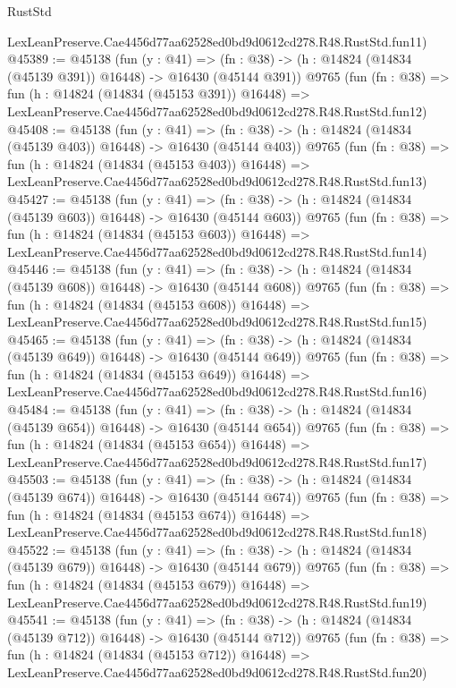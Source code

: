 \begin{lexlean}{RustStd}
\begin{coremodule}
    LexLeanPreserve.Cae4456d77aa62528ed0bd9d0612cd278.R48.RustStd.fun11)
@45389 := @45138
    (fun (y : @41) =>
    (fn : @38) -> (h : @14824 (@14834 (@45139 @391)) @16448) -> @16430 (@45144 @391))
    @9765
    (fun (fn : @38) =>
    fun (h : @14824 (@14834 (@45153 @391)) @16448) =>
    LexLeanPreserve.Cae4456d77aa62528ed0bd9d0612cd278.R48.RustStd.fun12)
@45408 := @45138
    (fun (y : @41) =>
    (fn : @38) -> (h : @14824 (@14834 (@45139 @403)) @16448) -> @16430 (@45144 @403))
    @9765
    (fun (fn : @38) =>
    fun (h : @14824 (@14834 (@45153 @403)) @16448) =>
    LexLeanPreserve.Cae4456d77aa62528ed0bd9d0612cd278.R48.RustStd.fun13)
@45427 := @45138
    (fun (y : @41) =>
    (fn : @38) -> (h : @14824 (@14834 (@45139 @603)) @16448) -> @16430 (@45144 @603))
    @9765
    (fun (fn : @38) =>
    fun (h : @14824 (@14834 (@45153 @603)) @16448) =>
    LexLeanPreserve.Cae4456d77aa62528ed0bd9d0612cd278.R48.RustStd.fun14)
@45446 := @45138
    (fun (y : @41) =>
    (fn : @38) -> (h : @14824 (@14834 (@45139 @608)) @16448) -> @16430 (@45144 @608))
    @9765
    (fun (fn : @38) =>
    fun (h : @14824 (@14834 (@45153 @608)) @16448) =>
    LexLeanPreserve.Cae4456d77aa62528ed0bd9d0612cd278.R48.RustStd.fun15)
@45465 := @45138
    (fun (y : @41) =>
    (fn : @38) -> (h : @14824 (@14834 (@45139 @649)) @16448) -> @16430 (@45144 @649))
    @9765
    (fun (fn : @38) =>
    fun (h : @14824 (@14834 (@45153 @649)) @16448) =>
    LexLeanPreserve.Cae4456d77aa62528ed0bd9d0612cd278.R48.RustStd.fun16)
@45484 := @45138
    (fun (y : @41) =>
    (fn : @38) -> (h : @14824 (@14834 (@45139 @654)) @16448) -> @16430 (@45144 @654))
    @9765
    (fun (fn : @38) =>
    fun (h : @14824 (@14834 (@45153 @654)) @16448) =>
    LexLeanPreserve.Cae4456d77aa62528ed0bd9d0612cd278.R48.RustStd.fun17)
@45503 := @45138
    (fun (y : @41) =>
    (fn : @38) -> (h : @14824 (@14834 (@45139 @674)) @16448) -> @16430 (@45144 @674))
    @9765
    (fun (fn : @38) =>
    fun (h : @14824 (@14834 (@45153 @674)) @16448) =>
    LexLeanPreserve.Cae4456d77aa62528ed0bd9d0612cd278.R48.RustStd.fun18)
@45522 := @45138
    (fun (y : @41) =>
    (fn : @38) -> (h : @14824 (@14834 (@45139 @679)) @16448) -> @16430 (@45144 @679))
    @9765
    (fun (fn : @38) =>
    fun (h : @14824 (@14834 (@45153 @679)) @16448) =>
    LexLeanPreserve.Cae4456d77aa62528ed0bd9d0612cd278.R48.RustStd.fun19)
@45541 := @45138
    (fun (y : @41) =>
    (fn : @38) -> (h : @14824 (@14834 (@45139 @712)) @16448) -> @16430 (@45144 @712))
    @9765
    (fun (fn : @38) =>
    fun (h : @14824 (@14834 (@45153 @712)) @16448) =>
    LexLeanPreserve.Cae4456d77aa62528ed0bd9d0612cd278.R48.RustStd.fun20)

\end{coremodule}
\end{lexlean}
